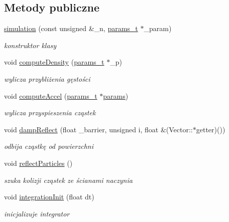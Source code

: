 \subsection*{Metody publiczne}
\begin{DoxyCompactItemize}
\item 
\hyperlink{classsimulation_a30fdcc611ae9a656a3aebb8445e4607d}{simulation} (const unsigned \&\+\_\+n, \hyperlink{structparams__t}{params\+\_\+t} $\ast$\+\_\+param)
\begin{DoxyCompactList}\small\item\em konstruktor klasy \end{DoxyCompactList}\item 
void \hyperlink{classsimulation_a7679fcd9a25d6cb5597338d054a30684}{compute\+Density} (\hyperlink{structparams__t}{params\+\_\+t} $\ast$\+\_\+p)
\begin{DoxyCompactList}\small\item\em wylicza przybliżenia gęstości \end{DoxyCompactList}\item 
void \hyperlink{classsimulation_a16b945b81e27680a709fffd8663bf856}{compute\+Accel} (\hyperlink{structparams__t}{params\+\_\+t} $\ast$\hyperlink{classsimulation_a861b82cc3c0e7e58abfba464a133dae3}{params})
\begin{DoxyCompactList}\small\item\em wylicza przyspieszenia cząstek \end{DoxyCompactList}\item 
void \hyperlink{classsimulation_a353d4dd3a66197360e882bc29a6fef0b}{damp\+Reflect} (float \+\_\+barrier, unsigned i, float \&(Vector\+::$\ast$getter)())
\begin{DoxyCompactList}\small\item\em odbija cząstkę od powierzchni \end{DoxyCompactList}\item 
void \hyperlink{classsimulation_a9cb3fe3f985ceb039736a666923a20b5}{reflect\+Particles} ()
\begin{DoxyCompactList}\small\item\em szuka kolizji cząstek ze ścianami naczynia \end{DoxyCompactList}\item 
void \hyperlink{classsimulation_a300e67649652f2ae9337af3d5244e0f7}{integration\+Init} (float dt)
\begin{DoxyCompactList}\small\item\em inicjalizuje integrator \end{DoxyCompactList}\item 

\end{DoxyCompactItemize}
